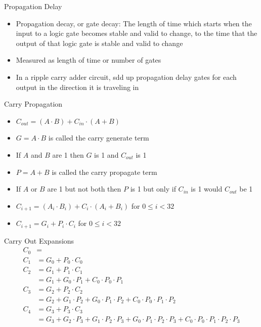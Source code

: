 \documentclass[12pt]{article}
\begin{document}
 Propagation Delay \begin{itemize} 
 \item Propagation decay, or gate decay: The length of time which starts when the input to a logic gate becomes stable and valid to change, to the time that the output of that logic gate is stable and valid to change 
\item Measured as length of time or number of gates 
\item In a ripple carry adder circuit, sdd up propagation delay gates for each output in the direction it is traveling in 
\end{itemize} 


Carry Propagation \begin{itemize} 
\item $C_{out} = (A \cdot B) + C_{in} \cdot (A + B) $
\item $G = A \cdot B$ is called the carry generate term 
\item If $A$ and $B$ are 1 then $G$ is 1 and $C_{out}$ is 1
\item $P = A + B$ is called the carry propagate term 
\item If $A$ or $B$ are 1 but not both then $P$ is 1 but only if $C_{in}$ is 1 would $C_{out}$ be 1 
\item $C_{i + 1} = (A_i \cdot B_i) + C_i \cdot (A_i + B_i)$ for $0 \leq i < 32$ 
\item $C_{i + 1} = G_i + P_i \cdot C_i$ for $0 \leq i < 32$ 

\end{itemize} 

Carry Out Expansions $$\begin{aligned} 
C_0 &= \\ 
C_1 &= G_0 + P_0 \cdot C_0 \\ 
C_2 &= G_1 + P_1 \cdot C_1 \\ 
&= G_1 + G_0 \cdot P_1 + C_0 \cdot P_0 \cdot P_1 \\
C_3 &= G_2 + P_2 \cdot C_2 \\ 
&= G_2 + G_1 \cdot P_2 + G_0 \cdot P_1 \cdot P_2 + C_0 \cdot P_0 \cdot P_1 \cdot P_2 \\ 
C_4 &= G_3 + P_3 \cdot C_3 \\ 
&= G_3 + G_2 \cdot P_3 + G_1 \cdot P_2 \cdot P_3 + G_0 \cdot P_1 \cdot P_2 \cdot P_3 + C_0 \cdot P_0 \cdot P_1 \cdot P_2 \cdot P_3 \end{aligned} $$ 
\end{document}
